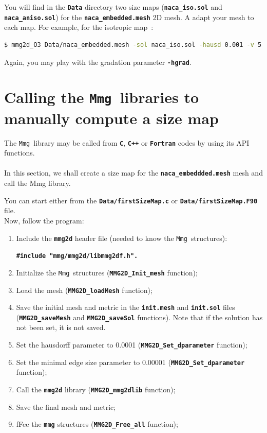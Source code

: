 \documentclass{article}
\newcommand{\ttb}[1]{\texttt{\textbf{#1}}}
\newcommand{\mmg}{\texttt{Mmg}}
\begin{document}
You will find in the \ttb{Data} directory two size maps (\ttb{naca\_iso.sol} and
\ttb{naca\_aniso.sol}) for the
\ttb{naca\_embedded.mesh} 2D mesh. A adapt your mesh to each map. For
example, for the isotropic map~:
\begin{lstlisting}[language=bash]
$ mmg2d_O3 Data/naca_embedded.mesh -sol naca_iso.sol -hausd 0.001 -v 5
\end{lstlisting}

Again, you may play with the gradation parameter \ttb{-hgrad}.

\section{Calling the \mmg\ libraries to manually compute a size map\label{size_map}}
The \mmg\ library may be called from \ttb{C}, \ttb{C++} or \ttb{Fortran} codes by
using its API functions.\\
\\
In this section, we shall create a size map for the
\ttb{naca\_embeddded.mesh} mesh and call the Mmg library.

 You can
start either from the \ttb{Data/firstSizeMap.c} or
\ttb{Data/firstSizeMap.F90} file.\\
Now, follow the program:
\begin{enumerate}
\item Include the \ttb{mmg2d} header file (needed to know the \mmg\ structures):
\begin{center}
\ttb{\#include "mmg/mmg2d/libmmg2df.h".}
\end{center}
\item Initialize the \mmg\ structures (\ttb{MMG2D\_Init\_mesh} function);
\item Load the mesh (\ttb{MMG2D\_loadMesh} function);
\item Save the initial mesh and metric in the \ttb{init.mesh} and
  \ttb{init.sol} files (\ttb{MMG2D\_saveMesh} and \ttb{MMG2D\_saveSol}
  functions). Note that if the solution has not been set, it is not saved.
\item Set the hausdorff parameter to 0.0001 (\ttb{MMG2D\_Set\_dparameter} function);
\item Set the minimal edge size parameter to 0.00001 (\ttb{MMG2D\_Set\_dparameter} function);
\item Call the \ttb{mmg2d} library (\ttb{MMG2D\_mmg2dlib} function);
\item Save the final mesh and metric;
\item fFee the \ttb{mmg} structures (\ttb{MMG2D\_Free\_all} function);\\
\end{enumerate}
\end{document}
